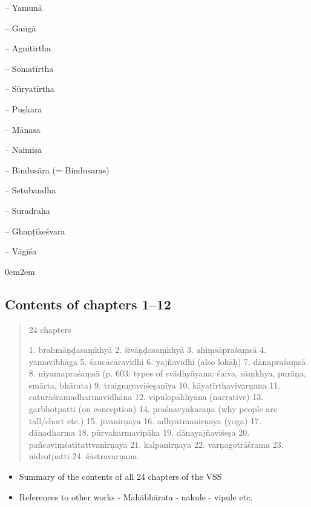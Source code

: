 \documentclass[11pt]{book}
\begin{document}
 	-- Yamunā
 	
 	-- Gaṅgā
 	
 	-- Agnitīrtha %
 	
 	-- Somatīrtha %
 	
 	-- Sūryatīrtha %
 	
 	-- Puṣkara %
 	
 	-- Mānasa %
    
    -- Naimiṣa %
    
    -- Bindusāra (= Bindusaras) %
    
    -- Setubandha %
    
    -- Suradraha %
    
    -- Ghaṇṭikeśvara
    
    -- Vāgīśa





\leftskip0em\parindent2em


\vfill
\pagebreak

\subsection{Contents of chapters 1--12}

\begin{quote}
  24 chapters

  1. brahmāṇḍasaṃkhyā 
  2. śivāṇḍasaṃkhyā 
  3. ahiṃsāpraśaṃsā 
  4. yamavibhāga
  5. śaucācāravidhi
  6. yajñavidhi (also lokāḥ)
  7. dānapraśaṃsā 
  8. niyamapraśaṃsā (p. 603: types of svādhyāyana: śaiva, sāṃkhya, purāṇa,
                    smārta, bhārata)
  9. traiguṇyaviśeṣaṇīya
  10. kāyatīrthavivarṇana
  11. caturāśramadharmavidhāna 
  12. vipulopākhyāna  (narrative)
  13. garbhotpatti (on conception)
  14. praśnavyākaraṇa (why people are tall/short etc.)
  15. jīvanirṇaya 
  16. adhyātmanirṇaya (yoga) 
  17. dānadharma
  18. pūrvakarmavipāka
  19. dānayajñaviśeṣa
  20. pañcaviṃśatitattvanirṇaya
  21. kalpanirṇaya
  22. varṇagotrāśrama
  23. nidrotpatti
  24. śāstravarṇana
\end{quote}

\begin{itemize}

\item
  Summary of the contents of all 24 chapters of the VSS
\item
  References to other works - Mahābhārata - nakule - vipule etc.
\end{itemize}
\end{document}
